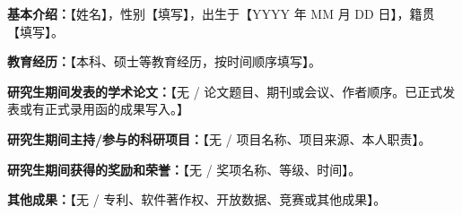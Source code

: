 \textbf{基本介绍：}【姓名】，性别【填写】，出生于【YYYY 年 MM 月 DD 日】，籍贯【填写】。

\textbf{教育经历：}【本科、硕士等教育经历，按时间顺序填写】。

\textbf{研究生期间发表的学术论文：}【无 / 论文题目、期刊或会议、作者顺序。已正式发表或有正式录用函的成果写入。】

\textbf{研究生期间主持/参与的科研项目：}【无 / 项目名称、项目来源、本人职责】。

\textbf{研究生期间获得的奖励和荣誉：}【无 / 奖项名称、等级、时间】。

\textbf{其他成果：}【无 / 专利、软件著作权、开放数据、竞赛或其他成果】。
